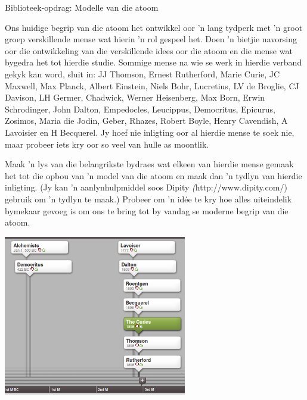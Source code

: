 \begin{project}{Biblioteek-opdrag: Modelle van die atoom}
            \nopagebreak
            \label{m38756*eip-3}

Ons huidige begrip van die atoom het ontwikkel oor  'n lang tydperk met  'n groot groep verskillende mense wat hierin  'n rol gespeel het. Doen  'n bietjie navorsing oor die ontwikkeling van die verskillende idees oor die atoom en die mense wat bygedra het tot hierdie studie. Sommige mense na wie se werk in hierdie verband gekyk kan word, sluit in: JJ Thomson, Ernest Rutherford, Marie Curie, JC Maxwell, Max Planck, Albert Einstein, Niels Bohr, Lucretius, LV de Broglie, CJ Davison, LH Germer, Chadwick, Werner Heisenberg, Max Born, Erwin Schrodinger, John Dalton, Empedocles, Leucippus,
Democritus, Epicurus, Zosimos, Maria die Jodin, Geber, Rhazes, Robert Boyle, Henry Cavendish, A Lavoisier en H Becquerel. Jy hoef nie inligting oor al hierdie mense te soek nie, maar probeer iets kry oor so veel van hulle as moontlik.
\par \begin{minipage}{.5\textwidth}
\label{m38756*id7342}Maak  'n lys van die belangrikste bydraes wat elkeen van hierdie mense gemaak het tot die opbou van  'n model van die atoom en maak dan  'n tydlyn van hier\-die inligting. (Jy kan  'n aanlynhulpmiddel soos Dipity \textsl(http://www.dipity.com/) gebruik om  'n tydlyn te maak.) Probeer om  'n idée te kry hoe alles uiteindelik bymekaar gevoeg is om ons te bring tot by vandag se moderne begrip van die atoom.
\end{minipage}
\begin{minipage}{.5\textwidth}
 \begin{center}
  \includegraphics[width=0.6\textwidth]{photos/timeline_atom.png}
 \end{center}

\end{minipage}

\end{project}
\par \label{m38756*cid2}

